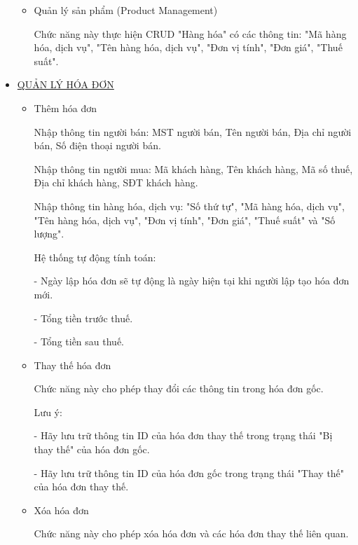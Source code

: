 \begin{itemize}
\begin{itemize}
              \item Quản lý sản phẩm (Product Management)

                    Chức năng này thực hiện CRUD "Hàng hóa" có các thông tin: "Mã hàng hóa, dịch vụ", "Tên hàng hóa, dịch vụ", "Đơn vị tính", "Đơn giá", "Thuế suất".

          \end{itemize}

    \item \underline{QUẢN LÝ HÓA ĐƠN}

          \begin{itemize}

              \item Thêm hóa đơn

                    Nhập thông tin người bán: MST người bán, Tên người bán, Địa chỉ người bán, Số điện thoại người bán.

                    Nhập thông tin người mua: Mã khách hàng, Tên khách hàng, Mã số thuế, Địa chỉ khách hàng, SĐT khách hàng.

                    Nhập thông tin hàng hóa, dịch vụ: "Số thứ tự", "Mã hàng hóa, dịch vụ", "Tên hàng hóa, dịch vụ", "Đơn vị tính", "Đơn giá", "Thuế suất" và "Số lượng".

                    Hệ thống tự động tính toán:

                    - Ngày lập hóa đơn sẽ tự động là ngày hiện tại khi người lập tạo hóa đơn mới.

                    - Tổng tiền trước thuế.

                    - Tổng tiền sau thuế.

              \item Thay thế hóa đơn

                    Chức năng này cho phép thay đổi các thông tin trong hóa đơn gốc.

                    Lưu ý:

                    - Hãy lưu trữ thông tin ID của hóa đơn thay thế trong trạng thái "Bị thay thế" của hóa đơn gốc.

                    - Hãy lưu trữ thông tin ID của hóa đơn gốc trong trạng thái "Thay thế" của hóa đơn thay thế.

              \item Xóa hóa đơn

                    Chức năng này cho phép xóa hóa đơn và các hóa đơn thay thế liên quan.

          \end{itemize}


\end{itemize}
